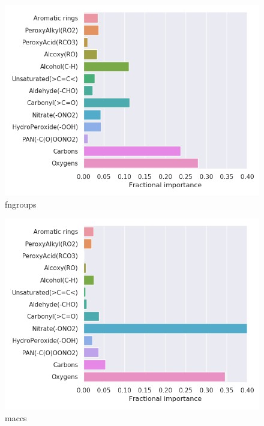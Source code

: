 \begin{subfigure}[b]{0.5\textwidth}
    \centering
    \includegraphics[width=\textwidth]{outputs/PCA/fngroups/legend.png}
    \caption{fngroups}
    \label{fig:legend_PCA_fngroups}
\end{subfigure}
\begin{subfigure}[b]{0.5\textwidth}
    \centering
    \includegraphics[width=\textwidth]{outputs/PCA/maccs/legend.png}
    \caption{maccs}
    \label{fig:legend_PCA_maccs}
\end{subfigure}

